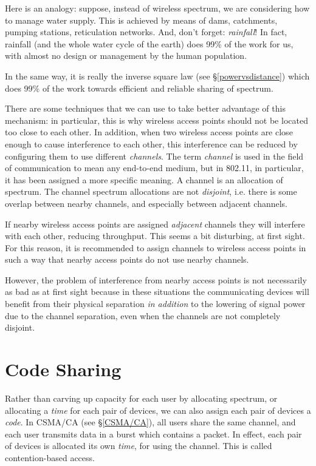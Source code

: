 Here is an analogy: suppose, instead of wireless spectrum, we are considering how to manage 
water supply. This is achieved by means of dams, catchments, pumping stations, reticulation networks.
And, don't forget: {\em rainfall}! In fact, rainfall (and the whole water cycle of the earth) 
does 99\% of the work for us, with almost no design or management by the human population.

In the same way, it is really the inverse square law (see \S\ref{powervsdistance}) which 
does 99\% of the work towards efficient and reliable sharing of spectrum.

There are some techniques that we can use to take better advantage of this mechanism:
in particular, this is why wireless access points should not be located too close
to each other. In addition, when two wireless access points are close enough
to cause interference to each other, this interference can be reduced by 
configuring them to use different {\em channels}. The term {\em channel} is
used in the field of communication to mean any end-to-end medium, but in 
802.11, in particular, it has been assigned a more specific meaning. A channel
is an allocation of spectrum. The channel spectrum allocations are not
{\em disjoint}, i.e. there is some overlap between nearby channels, and
especially between adjacent channels.

If nearby wireless access points are assigned {\em adjacent} channels
they will interfere with each other, reducing throughput. This seems a bit disturbing,
at first sight. For this reason, it is recommended to assign channels to wireless
access points in such a way that nearby access points do not use nearby channels.

However, the problem of interference from nearby access points is not necessarily
as bad as at first sight because in these situations the communicating devices
will benefit from their physical separation {\em in addition} to the lowering
of signal power due to the channel separation, even when the channels are not
completely disjoint.

\section{Code Sharing}

Rather than carving up capacity for each user by allocating spectrum, or 
allocating a {\em time} for each pair of devices, 
we can also assign each pair of devices a {\em code}. In CSMA/CA (see \S\ref{CSMA/CA}),
all users share the same channel, and each user transmits data
in a burst which contains a packet. In effect, each pair of devices is
allocated its own {\em time}, for using the channel. This is called contention-based 
access. 


